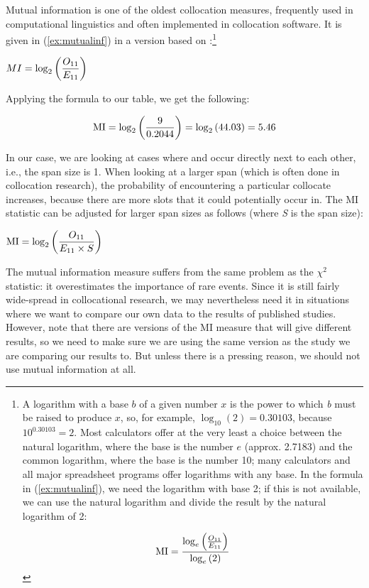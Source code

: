 Mutual information  is one of the oldest collocation  measures, frequently used in computational linguistics and often implemented in collocation software. It is given in (\ref{ex:mutualinf}) in a version based on \citet{church_word_1990}:\footnote{A logarithm  with a base $b$ of a given number $x$ is the power to which \textit{b} must be raised to produce $x$, so, for example, $\log_{10}(2) = 0.30103$, because $10^{0.30103}=2$. Most calculators offer at the very least a choice between the natural logarithm, where the base is the number $e$ (approx. 2.7183) and the common logarithm,  where the base is the number 10; many calculators and all major spreadsheet programs offer logarithms with any base. In the formula in (\ref{ex:mutualinf}), we need the logarithm with base 2; if this is not available, we can use the natural logarithm and divide the result by the natural logarithm of 2:

\[\text{MI} = {{\log_e \left( {O_{11}} \over {E_{11}} \right)} \over {\log_e \left( 2 \right)}}\]}

\begin{exe}
\ex $\displaystyle{MI = {\log_2 \left( {O_{11}} \over {E_{11}} \right)}}$
\label{ex:mutualinf}
\end{exe}

Applying the formula to our table, we get the following:

\[\text{MI} = {\log_2 \left( {9} \over {0.2044} \right) = \log_2 \left( 44.03 \right)} = 5.46\]

In our case, we are looking at cases where  and  occur directly next to each other, i.e., the span  size is 1. When looking at a larger span (which is often done in collocation  research), the probability  of encountering a particular collocate increases, because there are more slots that it could potentially occur in. The MI statistic can be adjusted for larger span sizes as follows (where \textit{S} is the span size):

\begin{exe}
\ex $\displaystyle{\text{MI} = {\log_2 \left( {O_{11}} \over {E_{11} \times S} \right)}}$
\label{ex:mutualinfspan}
\end{exe}

The mutual information  measure suffers from the same problem as the $\chi^2$  statistic:  it overestimates the importance of rare events. Since it is still fairly wide\hyp{}spread in collocational  research, we may nevertheless need it in situations where we want to compare our own data to the results of published studies. However, note that there are versions of the MI measure that will give different results, so we need to make sure we are using the same version as the study we are comparing our results to. But unless there is a pressing reason, we should not use mutual information  at all.

